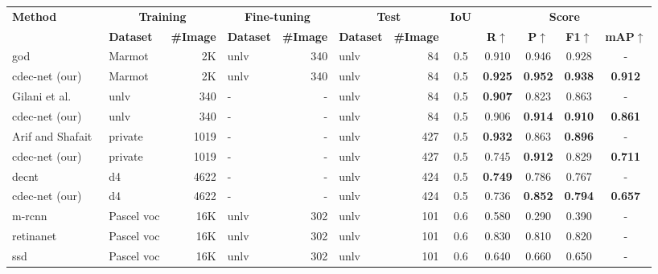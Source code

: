 \documentclass[a4paper,conference]{IEEEtran}
\begin{document}
\begin{table*}
\begin{center}
\begin{tabular}{|l| l | r|l |r|l|r| c| c c c c|} \hline
\textbf{Method} &\multicolumn{2}{|c|}{\textbf{Training}} &\multicolumn{2}{|c|}{\textbf{Fine-tuning}} &\multicolumn{2}{|c|}{\textbf{Test}} &\textbf{IoU} & \multicolumn{4}{|c|}{\textbf{Score}} \\ \cline{2-7} \cline{9-12}
  &\textbf{Dataset} &\textbf{\#Image} &\textbf{Dataset} &\textbf{\#Image} &\textbf{Dataset} &\textbf{\#Image} &  &\textbf{R}$\uparrow$ &\textbf{P}$\uparrow$ &\textbf{F1}$\uparrow$ &\textbf{mAP}$\uparrow$ \\ 
  \hline  
{\sc god}~\cite{saha2019graphical} &Marmot &2K &{\sc unlv} &340 &{\sc unlv} &84 &0.5 &0.910 &0.946 &0.928 &- \\ 
{\sc cd}e{\sc c-n}et (our) &Marmot &2K &{\sc unlv} &340 &{\sc unlv} &84 &0.5 &\textbf{0.925} &\textbf{0.952} &\textbf{0.938} & \textbf{0.912} \\ \hhline{|=|=|=|=|=|=|=|=|====|}
Gilani et al.~\cite{gilani2017table} &{\sc unlv} &340 &- &- &{\sc unlv} &84 &0.5 &\textbf{0.907} &0.823 &0.863 &- \\
{\sc cd}e{\sc c-n}et (our) &{\sc unlv} &340 &- &- &{\sc unlv} &84 &0.5 &0.906 &\textbf{0.914} &\textbf{0.910} &\textbf{0.861} \\ \hhline{|=|=|=|=|=|=|=|=|====|}
Arif and Shafait~\cite{arif2018table} &private &1019 &- &- &{\sc unlv} &427 &0.5 &\textbf{0.932} &0.863 &\textbf{0.896} &- \\ 
{\sc cd}e{\sc c-n}et (our) &private &1019 &- &- &{\sc unlv} &427 &0.5 &0.745 &\textbf{0.912} &0.829 &\textbf{0.711}  \\ \hhline{|=|=|=|=|=|=|=|=|====|}
{\sc d}e{\sc cnt}~\cite{siddiqui2018decnt} &{\sc d4} &4622 &- &- &{\sc unlv} &424 &0.5 &\textbf{0.749} &0.786 &0.767 &- \\ 
{\sc cd}e{\sc c-n}et (our) &{\sc d4} &4622 &- &- &{\sc unlv} &424 &0.5 &0.736 &\textbf{0.852} &\textbf{0.794} &\textbf{0.657} \\ \hhline{|=|=|=|=|=|=|=|=|====|}
{\sc m-rcnn}~\cite{casado2019benefits} &Pascel {\sc voc} &16K &{\sc unlv} &302 &{\sc unlv} &101 &0.6 &0.580 &0.290 &0.390 &- \\
{\sc r}etina{\sc n}et~\cite{casado2019benefits} &Pascel {\sc voc} &16K &{\sc unlv} &302 &{\sc unlv} &101 &0.6 &0.830 &0.810 &0.820 &- \\
{\sc ssd}~\cite{casado2019benefits} &Pascel {\sc voc} &16K &{\sc unlv} &302 &{\sc unlv} &101 &0.6 &0.640 &0.660 &0.650 &- \\

\end{tabular}
\end{center}
\end{table*}
\end{document}
